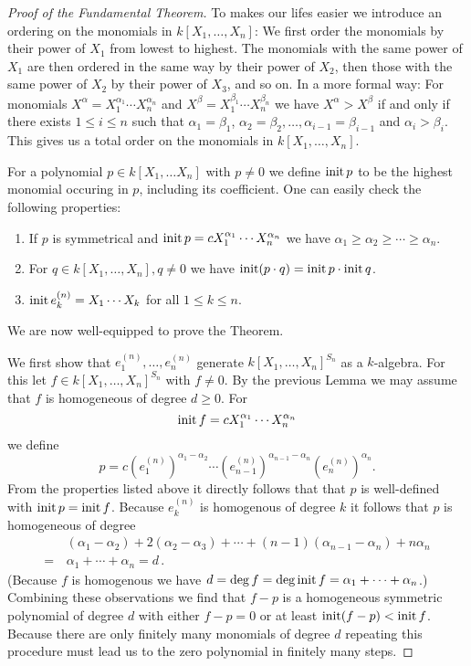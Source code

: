 \begin{proof}[Proof of the Fundamental Theorem]
  To makes our lifes easier we introduce an ordering on the monomials in $k[X_1, \dotsc, X_n]$:
  We first order the monomials by their power of $X_1$ from lowest to highest.
  The monomials with the same power of $X_1$ are then ordered in the same way by their power of $X_2$, then those with the same power of $X_2$ by their power of $X_3$, and so on.
  In a more formal way:
  For monomials $X^\alpha = X_1^{\alpha_1} \dotsm X_n^{\alpha_n}$ and $X^\beta = X_1^{\beta_1} \dotsm X_n^{\beta_n}$ we have $X^\alpha > X^\beta$ if and only if there exists $1 \leq i \leq n$ such that $\alpha_1 = \beta_1$, $\alpha_2 = \beta_2, \dotsc, \alpha_{i-1} = \beta_{i-1}$ and $\alpha_i > \beta_i$.
  This gives us a total order on the monomials in $k[X_1, \dotsc, X_n]$.
  
  For a polynomial $p \in k[X_1, \dotsc X_n]$ with $p \neq 0$ we define $\operatorname{init} p$ to be the highest monomial occuring in $p$, including its coefficient.
  One can easily check the following properties:
  \begin{enumerate}[label=\emph{\alph*)},leftmargin=*]
    \item
      If $p$ is symmetrical and $\operatorname{init} p = c X_1^{\alpha_1} \dotsm X_n^{\alpha_n}$ we have $\alpha_1 \geq \alpha_2 \geq \dotsb \geq \alpha_n$.
    \item
      For $q \in k[X_1, \dotsc, X_n], q \neq 0$ we have $\operatorname{init} (p \cdot q) = \operatorname{init} p \cdot \operatorname{init} q$.
    \item
      $\operatorname{init} e^{(n)}_k = X_1 \dotsm X_k$ for all $1 \leq k \leq n$.
  \end{enumerate}
  We are now well-equipped to prove the Theorem. 
  
  We first show that $e^{(n)}_1, \dotsc, e^{(n)}_n$ generate $k[X_1, \dotsc, X_n]^{S_n}$ as a $k$-algebra.
  For this let $f \in k[X_1, \dotsc, X_n]^{S_n}$ with $f \neq 0$.
  By the previous Lemma we may assume that $f$ is homogeneous of degree $d \geq 0$.
  For
  \[
      \operatorname{init} f
    = c X_1^{\alpha_1} \dotsm X_n^{\alpha_n}
  \]
  we define
  \[
      p
    =         c
              \left( e^{(n)}_1 \right)^{\alpha_1 - \alpha_2}
      \dotsm \left( e^{(n)}_{n-1} \right)^{\alpha_{n-1} - \alpha_n}
              \left( e^{(n)}_n \right)^{\alpha_n}.
  \]
  From the properties listed above it directly follows that that $p$ is well-defined with $\operatorname{init} p = \operatorname{init} f$.
  Because $e^{(n)}_k$ is homogenous of degree $k$ it follows that $p$ is homogeneous of degree
  \begin{align*}
     &\,  (\alpha_1-\alpha_2) + 2(\alpha_2-\alpha_3) + \dotsb + (n-1)(\alpha_{n-1}-\alpha_n)+n\alpha_n \\
    =&\,  \alpha_1 + \dotsb + \alpha_n
    =     d \,.
  \end{align*}
  (Because $f$ is homogenous we have $d = \deg f = \deg \operatorname{init} f = \alpha_1 + \dotsb + \alpha_n$.)
  Combining these observations we find that $f-p$ is a homogeneous symmetric polynomial of degree $d$ with either $f-p = 0$ or at least $\operatorname{init} (f-p) < \operatorname{init} f$.
  Because there are only finitely many monomials of degree $d$ repeating this procedure must lead us to the zero polynomial in finitely many steps.
  

\end{proof}
